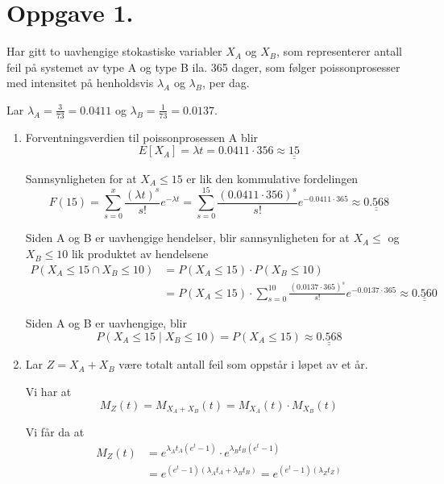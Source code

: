 \documentclass[a4paper,11pt,norsk]{article}
\begin{document}


\section*{Oppgave 1.}
Har gitt to uavhengige stokastiske variabler $X_A$ og $X_B$, som representerer 
antall feil på systemet av type A og type B ila. 365 dager, som følger poissonprosesser
med intensitet på henholdsvis $\lambda_A$ og $\lambda_B$, per dag.

Lar $\lambda_A = \frac{3}{73} = 0.0411$ og $\lambda_B = \frac{1}{73} = 0.0137$.

\begin{enumerate}
    \item {
        Forventningsverdien til poissonprosessen A blir
        \[
            E[X_A] = \lambda t = 0.0411 \cdot 356 \approx \underline{\underline{15}}
        \]

        Sannsynligheten for at $X_A \leq 15$ er lik den kommulative fordelingen
        \[ 
            F(15) = \sum_{s=0}^{x}{\frac{(\lambda t)^s}{s!}e^{-\lambda t}} = \sum_{s=0}^{15}{\frac{(0.0411 \cdot 356)^s}{s!}e^{-0.0411 \cdot 365}} \approx \underline{\underline{0.568}}
        \]

        Siden A og B er uavhengige hendelser, blir sannsynligheten for 
        at $X_A \leq$ og $X_B \leq 10$ lik produktet av hendelsene
        \begin{align*}
            P(X_A \leq 15 \cap X_B \leq 10) &= P(X_A \leq 15) \cdot P(X_B \leq 10) \\
                                            &= P(X_A \leq 15) \cdot \sum_{s=0}^{10}{\frac{(0.0137 \cdot 365)^s}{s!}e^{-0.0137 \cdot 365}} \approx \underline{\underline{0.560}}
        \end{align*}

        Siden A og B er uavhengige, blir 
        \[
            P(X_A \leq 15 \mid X_B \leq 10) = P(X_A \leq 15) \approx \underline{\underline{0.568}}
        \]
    }
    \item {
        Lar $Z = X_A + X_B$ være totalt antall feil som oppstår i løpet av et år.
        
        Vi har at
        \[
            M_Z(t) = M_{X_A + X_B}(t) = M_{X_A}(t) \cdot M_{X_B}(t)
        \]

        Vi får da at 
        \begin{align*}
            M_Z(t) &= e^{\lambda_A t_A (e^t - 1)} \cdot e^{\lambda_B t_B (e^t - 1)} \\ 
                   &= e^{\left(e^t-1\right)(\lambda_A t_A + \lambda_B t_B)} = e^{\left(e^t-1\right)(\lambda_Z t_Z)}
        \end{align*}

}
\end{enumerate}
\end{document}
